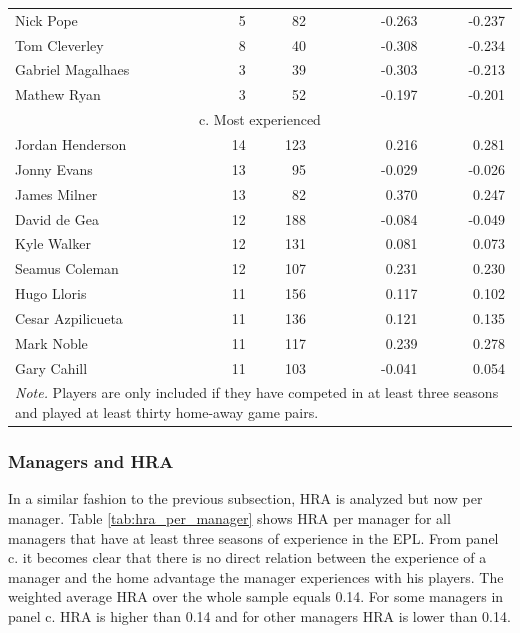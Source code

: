 \begin{table}[htbp]
\begin{spacing}{1.5}
\begin{tabular}{lrrrrr}
        Nick Pope & 5     & 82    &       & -0.263 & -0.237 \\
        Tom Cleverley & 8     & 40    &       & -0.308 & -0.234 \\
        Gabriel Magalhaes & 3     & 39    &       & -0.303 & -0.213 \\
        Mathew Ryan & 3     & 52    &       & -0.197 & -0.201 \\
        \midrule
        \multicolumn{6}{c}{c. Most experienced} \\
        \midrule
        Jordan Henderson & 14    & 123   &       & 0.216 & 0.281 \\
        Jonny Evans & 13    & 95    &       & -0.029 & -0.026 \\
        James Milner & 13    & 82    &       & 0.370 & 0.247 \\
        David de Gea & 12    & 188   &       & -0.084 & -0.049 \\
        Kyle Walker & 12    & 131   &       & 0.081 & 0.073 \\
        Seamus Coleman & 12    & 107   &       & 0.231 & 0.230 \\
        Hugo Lloris & 11    & 156   &       & 0.117 & 0.102 \\
        Cesar Azpilicueta & 11    & 136   &       & 0.121 & 0.135 \\
        Mark Noble & 11    & 117   &       & 0.239 & 0.278 \\
        Gary Cahill & 11    & 103   &       & -0.041 & 0.054 \\
        \bottomrule
        \bottomrule
        \multicolumn{6}{p{14cm}}{\footnotesize\textit{Note.} Players are only included if they have competed in at least three seasons and played at least thirty home-away game pairs.}
    \end{tabular}
    \end{spacing}
\end{table}


\subsubsection{Managers and HRA}
In a similar fashion to the previous subsection, HRA is analyzed but now per manager. Table \ref{tab:hra_per_manager} shows HRA per manager for all managers that have at least three seasons of experience in the EPL. From panel c. it becomes clear that there is no direct relation between the experience of a manager and the home advantage the manager experiences with his players. The weighted average HRA over the whole sample equals 0.14. For some managers in panel c. HRA is higher than 0.14 and for other managers HRA is lower than 0.14.

